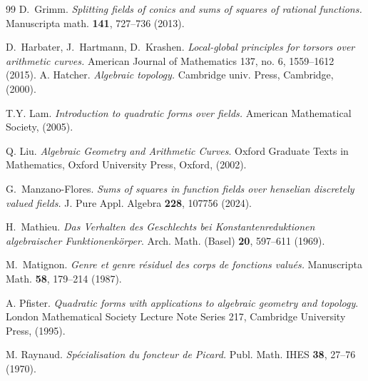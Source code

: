 \documentclass[a4paper,12pt,reqno]{amsart}
\theoremstyle{definition}
\numberwithin{equation}{thm}
\begin{document}
\begin{thebibliography}{99}
 D.~Grimm. \textit{Splitting fields of conics and sums of squares of rational functions.} Manuscripta math. {\bf 141}, 727--736 (2013).







 D.~Harbater, J.~Hartmann, D.~Krashen. \textit{Local-global principles for torsors over arithmetic curves.} American Journal of Mathematics 137, no. 6, 1559--1612 (2015).
A. Hatcher. \textit{Algebraic topology.}  Cambridge univ. Press, Cambridge, (2000).



T.Y. Lam. \textit{Introduction to quadratic forms over fields.} American
  Mathematical Society, (2005).

 Q. Liu. 
\textit{Algebraic Geometry and Arithmetic Curves}. Oxford Graduate Texts in Mathematics, Oxford University Press, Oxford, (2002).

 G.~Manzano-Flores. \textit{Sums of squares in function fields over henselian discretely valued fields.} J. Pure Appl. Algebra \textbf{228}, 107756 (2024).











H.~Mathieu. \textit{Das {V}erhalten des {G}eschlechts bei {K}onstantenreduktionen
              algebraischer {F}unktionenk\"{o}rper}. Arch. Math. (Basel) {\bf 20}, 597--611 (1969).

M.~Matignon. \textit{
Genre et genre r\'esiduel des corps de fonctions valu\'es.} Manuscripta Math. {\bf 58}, 179--214 (1987). 

 A. Pfister.
\textit{Quadratic forms with applications to algebraic geometry and topology}.
London Mathematical Society Lecture Note Series 217, Cambridge University Press, (1995).





M. Raynaud. \textit{Sp\'ecialisation du foncteur de Picard.} Publ. Math. IHES \textbf{38},
27--76 (1970).


\end{thebibliography}
\end{document}
